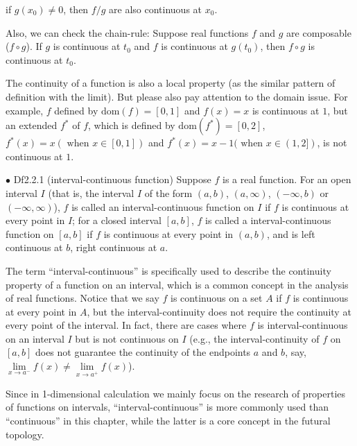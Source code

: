 \documentclass{article}
\begin{document}
\begin{Rmk}{}
\begin{compactenum}
{\begin{compactenum}
            \item if $g(x_0)\neq 0$, then $f/g$ are also continuous at $x_0$. 
        \end{compactenum}}
        \item Also, we can check the chain-rule: \textcolor{Th}{Suppose real functions $f$ and $g$ are composable ($f\circ g$). If $g$ is continuous at $t_0$ and $f$ is continuous at $g(t_0)$, then $f\circ g$ is continuous at $t_0$.}
        \item The continuity of a function is also a local property (as the similar pattern of definition with the limit). But please also pay attention to the domain issue. For example, $f$ defined by $\text{dom}(f) = [0,1]$ and $f(x) = x$ is continuous at $1$, but an extended $f^*$ of $f$, which is defined by $\text{dom}(f^*) = [0,2]$, $f^*(x) = x (\text{ when }x\in[0,1])$ and $f^*(x) = x-1 (\text{ when }x\in(1,2])$, is not continuous at $1$.
    \end{compactenum}
\end{Rmk}

\begin{Df}{$\bullet$ Df2.2.1 (interval-continuous function)}
    Suppose $f$ is a real function. For an open interval $I$ (that is, the interval $I$ of the form $(a,b)$, $(a, \infty)$, $(-\infty, b)$ or $(-\infty, \infty)$), $f$ is called an interval-continuous function on $I$ if $f$ is continuous at every point in $I$; for a closed interval $[a,b]$, $f$ is called a interval-continuous function on $[a,b]$ if $f$ is continuous at every point in $(a,b)$, and is left continuous at $b$, right continuous at $a$.
\end{Df}

\begin{Rmk}{}
    \begin{compactenum}
        \item The term ``interval-continuous'' is specifically used to describe the continuity property of a function on an interval, which is a common concept in the analysis of real functions. Notice that we say $f$ is continuous on a set $A$ if $f$ is continuous at every point in $A$, but the interval-continuity does not require the continuity at every point of the interval. In fact, there are cases where $f$ is interval-continuous on an interval $I$ but is not continuous on $I$ (e.g., the interval-continuity of $f$ on $[a,b]$ does not guarantee the continuity of the endpoints $a$ and $b$, say, $\lim\limits_{x\to a^-} f(x)\neq \lim\limits_{x\to a^+} f(x)$).
        \item Since in 1-dimensional calculation we mainly focus on the research of properties of functions on intervals, ``interval-continuous'' is more commonly used than ``continuous'' in this chapter, while the latter is a core concept in the futural topology.
    \end{compactenum}
\end{Rmk}
\end{document}
